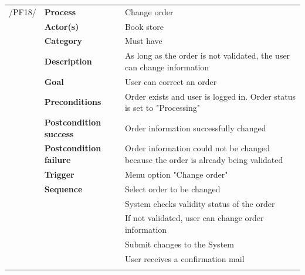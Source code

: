 \documentclass[11pt,a4paper,oneside,svgnames]{report}
\begin{document}
\noindent
\begin{tabular}{p{1.5cm}p{3cm}p{8cm}}
\cellcolor{white}/PF18/	& \textbf{Process} & Change order\\
\cellcolor{white}		& \textbf{Actor(s)} & Book store\\
\cellcolor{white}		& \textbf{Category} & Must have\\
\cellcolor{white}		& \textbf{Description}	 & As long as the order is not validated, the user can change information\\
\cellcolor{white}		& \textbf{Goal} & User can correct an order\\
\cellcolor{white}		& \textbf{Preconditions} & Order exists and user is logged in. Order status is set to "Processing"\\
\cellcolor{white}		& \textbf{Postcondition success} & Order information successfully changed\\
\cellcolor{white}		& \textbf{Postcondition failure} & Order information could not be changed because the order is already being validated\\
\cellcolor{white}		& \textbf{Trigger} & Menu option "Change order"\\
\cellcolor{white}		& \textbf{Sequence} & Select order to be changed\\
\cellcolor{white}		& & System checks validity status of the order\\
\cellcolor{white}		& & If not validated, user can change order information\\
\cellcolor{white}		& & Submit changes to the System\\
\cellcolor{white}		& & User receives a confirmation mail\\
\cellcolor{white}\hfill \\
\end{tabular}
\end{document}
